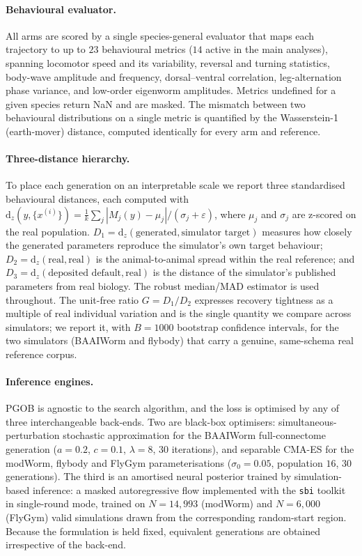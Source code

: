\documentclass[11pt]{article}
\begin{document}
\paragraph{Behavioural evaluator.} All arms are scored by a single species-general evaluator that maps each trajectory to up to $23$ behavioural metrics ($14$ active in the main analyses), spanning locomotor speed and its variability, reversal and turning statistics, body-wave amplitude and frequency, dorsal--ventral correlation, leg-alternation phase variance, and low-order eigenworm amplitudes. Metrics undefined for a given species return NaN and are masked. The mismatch between two behavioural distributions on a single metric is quantified by the Wasserstein-1 (earth-mover) distance, computed identically for every arm and reference.

\paragraph{Three-distance hierarchy.} To place each generation on an interpretable scale we report three standardised behavioural distances, each computed with $\mathrm{d}_z(y,\{x^{(i)}\})=\frac1k\sum_j|M_j(y)-\mu_j|/(\sigma_j+\varepsilon)$, where $\mu_j$ and $\sigma_j$ are z-scored on the real population. $D_1{=}\mathrm{d}_z(\text{generated},\text{simulator target})$ measures how closely the generated parameters reproduce the simulator's own target behaviour; $D_2{=}\mathrm{d}_z(\text{real},\text{real})$ is the animal-to-animal spread within the real reference; and $D_3{=}\mathrm{d}_z(\text{deposited default},\text{real})$ is the distance of the simulator's published parameters from real biology. The robust median/MAD estimator is used throughout. The unit-free ratio $G{=}D_1/D_2$ expresses recovery tightness as a multiple of real individual variation and is the single quantity we compare across simulators; we report it, with $B{=}1000$ bootstrap confidence intervals, for the two simulators (BAAIWorm and flybody) that carry a genuine, same-schema real reference corpus.

\paragraph{Inference engines.} PGOB is agnostic to the search algorithm, and the loss is optimised by any of three interchangeable back-ends. Two are black-box optimisers: simultaneous-perturbation stochastic approximation \citep[SPSA;][]{spall1992multivariate} for the BAAIWorm full-connectome generation ($a{=}0.2$, $c{=}0.1$, $\lambda{=}8$, $30$ iterations), and separable CMA-ES \citep{hansen2001completely} for the modWorm, flybody and FlyGym parameterisations ($\sigma_0{=}0.05$, population $16$, $30$ generations). The third is an amortised neural posterior trained by simulation-based inference: a masked autoregressive flow \citep[NPE-MAF;][]{papamakarios2017maf} implemented with the \texttt{sbi} toolkit \citep{tejero2020sbi} in single-round mode, trained on $N{=}14{,}993$ (modWorm) and $N{=}6{,}000$ (FlyGym) valid simulations drawn from the corresponding random-start region. Because the formulation is held fixed, equivalent generations are obtained irrespective of the back-end.
\end{document}
